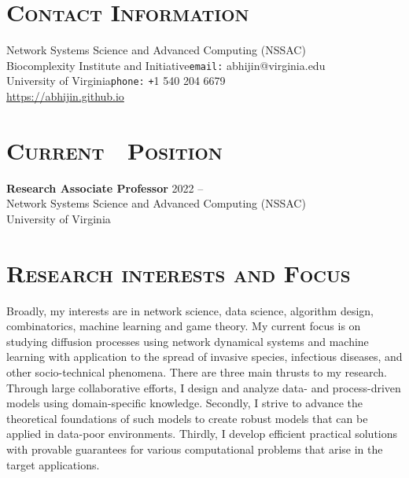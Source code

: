 \documentclass[margin,10pt]{res} %
\begin{document}
\begin{resume}

\section{\textnormal{\textsc{Contact Information}}}
Network Systems Science and Advanced Computing (NSSAC)\\
Biocomplexity Institute and Initiative\hfill \texttt{email:}
abhijin@virginia.edu\hspace{0mm}\mbox{}\\
University of Virginia\hfill \texttt{phone:}
\texttt{+}1 540 204 6679\hspace{6.5mm}\mbox{}\\
\url{https://abhijin.github.io}
\section{\textnormal{\textsc{Current\,\,\,\, Position}}}
\textbf{Research Associate Professor} \hfill 2022 -- \\
Network Systems Science and Advanced Computing (NSSAC)\\
University of Virginia
\section{\textnormal{\textsc{Research interests and Focus}}}
Broadly, my interests are in network science, data science, algorithm
design, combinatorics, machine learning and game theory. My current focus
is on studying diffusion processes using network dynamical systems and
machine learning with application to the spread of invasive species,
infectious diseases, and other socio-technical phenomena. There are three
main thrusts to my research.  Through large collaborative efforts, I design
and analyze data- and process-driven models using domain-specific
knowledge. Secondly, I strive to advance the theoretical foundations of
such models to create robust models that can be applied in data-poor
environments. Thirdly, I develop efficient practical solutions with
provable guarantees for various computational problems that arise in the
target applications.\\



\end{resume}
\end{document}
